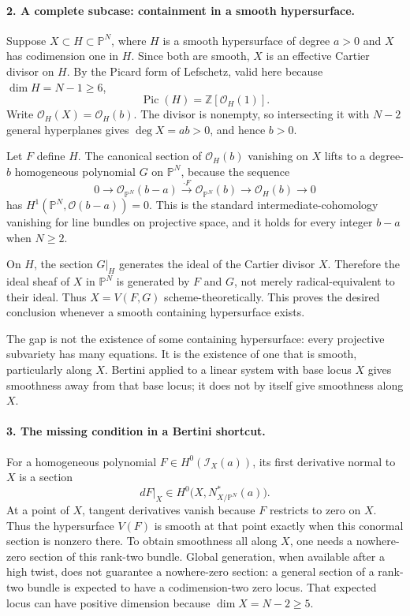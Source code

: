 \documentclass[11pt]{article}
\begin{document}
\paragraph{2. A complete subcase: containment in a smooth hypersurface.}
Suppose $X\subset H\subset\mathbb P^N$, where $H$ is a smooth hypersurface of degree $a>0$ and $X$ has codimension one in $H$. Since both are smooth, $X$ is an effective Cartier divisor on $H$. By the Picard form of Lefschetz, valid here because $\dim H=N-1\geq6$,
\[
 \operatorname{Pic}(H)=\mathbb Z[\mathcal O_H(1)].
\]
Write $\mathcal O_H(X)=\mathcal O_H(b)$. The divisor is nonempty, so intersecting it with $N-2$ general hyperplanes gives $\deg X=ab>0$, and hence $b>0$.

Let $F$ define $H$. The canonical section of $\mathcal O_H(b)$ vanishing on $X$ lifts to a degree-$b$ homogeneous polynomial $G$ on $\mathbb P^N$, because the sequence
\[
 0\longrightarrow\mathcal O_{\mathbb P^N}(b-a)
 \xrightarrow{\cdot F}\mathcal O_{\mathbb P^N}(b)
 \longrightarrow\mathcal O_H(b)\longrightarrow0
\]
has $H^1(\mathbb P^N,\mathcal O(b-a))=0$. This is the standard intermediate-cohomology vanishing for line bundles on projective space, and it holds for every integer $b-a$ when $N\geq2$.

On $H$, the section $G|_H$ generates the ideal of the Cartier divisor $X$. Therefore the ideal sheaf of $X$ in $\mathbb P^N$ is generated by $F$ and $G$, not merely radical-equivalent to their ideal. Thus $X=V(F,G)$ scheme-theoretically. This proves the desired conclusion whenever a smooth containing hypersurface exists.

The gap is not the existence of some containing hypersurface: every projective subvariety has many equations. It is the existence of one that is smooth, particularly along $X$. Bertini applied to a linear system with base locus $X$ gives smoothness away from that base locus; it does not by itself give smoothness along $X$.

\paragraph{3. The missing condition in a Bertini shortcut.}
For a homogeneous polynomial $F\in H^0(\mathcal I_X(a))$, its first derivative normal to $X$ is a section
\[
 dF|_X\in H^0\bigl(X,N^*_{X/\mathbb P^N}(a)\bigr).
\]
At a point of $X$, tangent derivatives vanish because $F$ restricts to zero on $X$. Thus the hypersurface $V(F)$ is smooth at that point exactly when this conormal section is nonzero there. To obtain smoothness all along $X$, one needs a nowhere-zero section of this rank-two bundle. Global generation, when available after a high twist, does not guarantee a nowhere-zero section: a general section of a rank-two bundle is expected to have a codimension-two zero locus. That expected locus can have positive dimension because $\dim X=N-2\geq5$.
\end{document}

